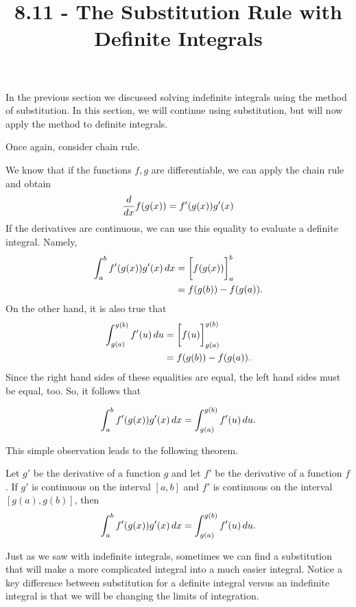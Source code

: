 \documentclass{ximera}
\title{8.11 - The Substitution Rule with Definite Integrals}
\begin{document}
\begin{abstract}
  
\end{abstract}
\maketitle

In the previous section we discussed solving indefinite integrals using the method of substitution. In this section, we will continue using substitution, but will now apply the method to definite integrals. 

Once again, consider chain rule. 

We know that if the functions $f,g$ are differentiable, we can apply the chain rule and obtain
\[
\frac{d}{\mathop{}\!d x} f(g(x)) = f'(g(x))g'(x)
\]
If the derivatives are continuous, we can use this equality to evaluate a definite integral. Namely,
\begin{align*}
  \int_a^b f'(g(x))g'(x) \mathop{}\!d x &= \bigg[ f(g(x)) \bigg]_a^b \\
  &= f(g(b)) - f(g(a)). \\
 \end{align*}
On the other hand, it is also true that
\begin{align*}
  \int_{g(a)}^{g(b)} f'(u)\mathop{}\!d u &= \bigg[ f(u) \bigg]_{g(a)}^{g(b)}\\
  &= f(g(b)) - f(g(a)). \\
 \end{align*}
 Since the right hand sides of these equalities are equal,  the left hand sides must be equal, too. So, it follows that
 
\[
  \int_a^b f'(g(x))g'(x) \mathop{}\!d x =  \int_{g(a)}^{g(b)} f'(u)\mathop{}\!d u .
\]

 
This simple observation  leads to the following theorem. 


\begin{theorem} 
Let $g'$ be the derivative of a  function $g$ and let $f'$ be the derivative of a function $f$. If $g'$ is continuous on the interval $[a,b]$ and  $f'$ is
continuous on the interval $[g(a),g(b)]$, then
\[
\int_a^b f'(g(x)) g'(x) \mathop{}\!d x =\int_{g(a)}^{g(b)} f'(u) \mathop{}\!d u.
\]
\end{theorem}
Just as we saw with indefinite integrals, sometimes we can find a substitution that will make a more complicated integral into a much easier integral. Notice a key difference between substitution for a definite integral versus an indefinite integral is that we will be changing the limits of integration. 
\end{document}
